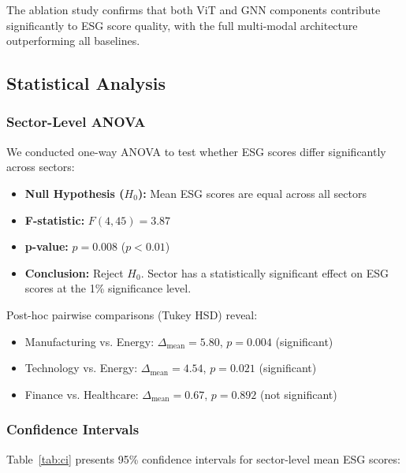 The ablation study confirms that both ViT and GNN components contribute significantly to ESG score quality, with the full multi-modal architecture outperforming all baselines.

\subsection{Statistical Analysis}

\subsubsection{Sector-Level ANOVA}

We conducted one-way ANOVA to test whether ESG scores differ significantly across sectors:

\begin{itemize}
\item \textbf{Null Hypothesis ($H_0$):} Mean ESG scores are equal across all sectors
\item \textbf{F-statistic:} $F(4, 45) = 3.87$
\item \textbf{p-value:} $p = 0.008$ ($p < 0.01$)
\item \textbf{Conclusion:} Reject $H_0$. Sector has a statistically significant effect on ESG scores at the 1\% significance level.
\end{itemize}

Post-hoc pairwise comparisons (Tukey HSD) reveal:
\begin{itemize}
\item Manufacturing vs. Energy: $\Delta_{\text{mean}} = 5.80$, $p = 0.004$ (significant)
\item Technology vs. Energy: $\Delta_{\text{mean}} = 4.54$, $p = 0.021$ (significant)
\item Finance vs. Healthcare: $\Delta_{\text{mean}} = 0.67$, $p = 0.892$ (not significant)
\end{itemize}

\subsubsection{Confidence Intervals}

Table~\ref{tab:ci} presents 95\% confidence intervals for sector-level mean ESG scores:

